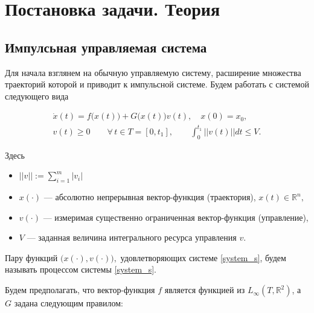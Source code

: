\chapter{Постановка задачи. Теория}
\label{ch:theory}

\section {Импулсьная управляемая система}

Для начала взглянем на обычную управляемую систему, расширение
множества траекторий которой и приводит к импульсной системе. Будем
работать с системой следующего вида

\begin{equation}
  \label{system_s}
  \begin{array}{l}
    \dot{x}(t)=f\big(x(t)\big)+G\big(x(t)\big)v(t), \quad x(0)=x_0, \\[8pt]
    v(t)\geq 0  \qquad \forall\, t\in T = [0,t_1], \qquad
    \displaystyle\int_{0}^{t_1} ||v(t)||dt\leq V.
  \end{array} \tag{$S$}
\end{equation}

Здесь
\begin{itemize}
  \item $||v||:=\displaystyle\sum_{i=1}^m |v_i|$
  \item $x(\cdot)$ --- абсолютно непрерывная вектор-функция
    (траектория), $x(t)\in {\mathbb R}^n,$
  \item $v(\cdot)$ --- измеримая существенно ограниченная
    вектор-функция (управление),
  
  \item $V$ --- заданная величина интегрального ресурса управления
    $v$.
\end{itemize}

Пару функций $\bigl(x(\cdot),v(\cdot)\bigr),$ удовлетворяющих
системе \eqref{system_s}, будем называть процессом системы \eqref{system_s}.

Будем предполагать, что вектор-функция $f$ является функцией из
$L_{\infty}(T,\mathbb{R}^2)$, а $G$ задана следующим правилом:

